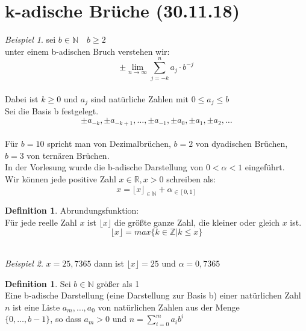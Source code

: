\documentclass[12pt,a4paper,titlepage]{article} %
\theoremstyle{definition}
\newtheorem{defi}[satz]{Definition}
\theoremstyle{remark}
\newtheorem*{bsp}{Beispiel}
\newcommand{\N}{\mathbb{N}}
\newcommand{\Z}{\mathbb{Z}}
\newcommand{\R}{\mathbb{R}}
\newcommand{\limes}[1]{\lim\limits_{#1\rightarrow\infty}}
\begin{document}
	\section{k-adische Brüche (30.11.18)}
	\begin{bsp}
		sei \(b \in \N \quad b \geq 2\)\\
		unter einem b-adischen Bruch verstehen wir:\\
		\[\pm \limes{n} \sum_{j=-k}^{n} a_j \cdot b^{-j}\]\\
		Dabei ist \(k \geq 0\) und \(a_j\) sind natürliche Zahlen mit \(0 \leq a_j \leq b\)\\
		Sei die Basis b festgelegt.\\
		\[\pm a_{-k}, \pm a_{-k+1}, \dots ,\pm a_{-1}, \pm a_0, \pm a_1, \pm a_2, \dots\]\\
		Für \(b = 10\) spricht man von Dezimalbrüchen, \(b = 2\) von dyadischen Brüchen, \(b = 3\) von ternären Brüchen.\\
		In der Vorlesung wurde die b-adische Darstellung von \(0 < \alpha < 1\) eingeführt. \\
		Wir können jede positive Zahl \(x \in \R, x > 0\) schreiben als:\\
		\[x = {\lfloor x \rfloor}_{\in \N} + \alpha_{\in [0, 1]} \]
	\end{bsp}
	\begin{defi}
		Abrundungsfunktion:\\
		Für jede reelle Zahl \(x\) ist \(\lfloor x \rfloor\) die größte ganze Zahl, die kleiner oder gleich \(x\) ist.\\
		\[\lfloor x \rfloor = max\{k \in \Z | k \leq x\}\]\\
		\begin{bsp}
			\(x = 25,7365\) dann ist \(\lfloor x \rfloor = 25\) und \(\alpha = 0,7365\)\\
		\end{bsp}
	\end{defi}
	\begin{defi}
		Sei \(b \in \N\) größer als 1\\
		Eine b-adische Darstellung (eine Darstellung zur Basis b) einer natürlichen Zahl \(n\) ist eine Liste \(a_m, \dots, a_0\) von natürlichen Zahlen aus der Menge\\
		\(\{0, \dots, b-1\}\), so dass \(a_m > 0\) und \(n = \sum_{i=0}^{m} a_ib^i\)
	\end{defi}
\end{document}
